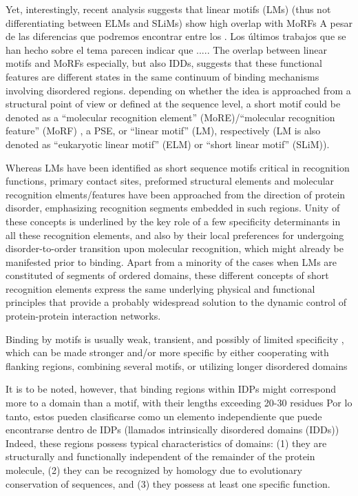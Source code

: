 Yet, interestingly, recent analysis suggests that linear motifs (LMs) (thus not differentiating between ELMs and SLiMs) show high overlap with MoRFs \cite{fuxreiter2007local}
A pesar de las diferencias que podremos encontrar entre los . Los últimos trabajos que se han hecho sobre el tema \cite{meszaros2012disordered, fuxreiter2007local} 
parecen indicar que .....
The overlap between linear motifs and MoRFs
especially, but also IDDs, suggests that these functional features
are different states in the same continuum of binding
mechanisms involving disordered regions.
depending
on whether the idea is approached from a structural point of view
or defined at the sequence level, a short motif could be denoted
as a “molecular recognition element” (MoRE)/“molecular
recognition feature” (MoRF) , a PSE, or “linear motif” (LM),
respectively (LM is also denoted as “eukaryotic linear motif”
(ELM) or “short linear motif” (SLiM)).


Whereas LMs have been identified as short sequence motifs critical in recognition functions, primary contact sites, preformed structural elements and molecular recognition elments/features have been approached from the direction of protein disorder, emphasizing recognition segments embedded in such regions. Unity of these concepts is underlined by the key role of a few specificity determinants in all these recognition elements, and also by their local preferences for undergoing disorder-to-order transition upon molecular recognition, which might already
be manifested prior to binding. 
Apart from a minority of the cases when LMs are constituted of segments of ordered domains, these different concepts of short recognition elements express the same underlying physical and
functional principles that provide a probably widespread solution to the dynamic control of protein-protein interaction networks.



Binding by motifs is usually weak, transient, and possibly of limited specificity , which can be made stronger and/or more
specific by either cooperating with flanking regions, combining several motifs, or utilizing longer disordered domains

It is to be noted, however, that binding regions within IDPs might correspond more to a domain than a motif, with their lengths exceeding 20-30 residues \cite{tompa2009close,chen2006conservation,chen2006conservationB}  
Por lo tanto, estos pueden clasificarse como un elemento independiente que puede encontrarse dentro de IDPs (llamados intrinsically disordered domains (IDDs))
Indeed, these regions possess typical characteristics of domains: 
(1) they are structurally and functionally independent of the remainder of the protein molecule, 
(2) they can be recognized by homology due to evolutionary conservation of sequences, and 
(3) they possess at least one specific function.

